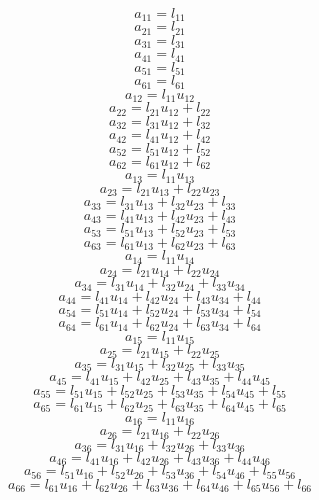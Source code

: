 \documentclass[10pt,a4paper,dvipdfmx]{article}
\begin{document}
\begin{multicols}{2}
$$ a_{{1}{1}} = l_{{1}{1}} $$
$$ a_{{2}{1}} = l_{{2}{1}} $$
$$ a_{{3}{1}} = l_{{3}{1}} $$
$$ a_{{4}{1}} = l_{{4}{1}} $$
$$ a_{{5}{1}} = l_{{5}{1}} $$
$$ a_{{6}{1}} = l_{{6}{1}} $$
$$ a_{{1}{2}} = l_{{1}{1}} u_{{1}{2}} $$
$$ a_{{2}{2}} = l_{{2}{1}} u_{{1}{2}} + l_{{2}{2}} $$
$$ a_{{3}{2}} = l_{{3}{1}} u_{{1}{2}} + l_{{3}{2}} $$
$$ a_{{4}{2}} = l_{{4}{1}} u_{{1}{2}} + l_{{4}{2}} $$
$$ a_{{5}{2}} = l_{{5}{1}} u_{{1}{2}} + l_{{5}{2}} $$
$$ a_{{6}{2}} = l_{{6}{1}} u_{{1}{2}} + l_{{6}{2}} $$
$$ a_{{1}{3}} = l_{{1}{1}} u_{{1}{3}} $$
$$ a_{{2}{3}} = l_{{2}{1}} u_{{1}{3}} + l_{{2}{2}} u_{{2}{3}} $$
$$ a_{{3}{3}} = l_{{3}{1}} u_{{1}{3}} + l_{{3}{2}} u_{{2}{3}} + l_{{3}{3}} $$
$$ a_{{4}{3}} = l_{{4}{1}} u_{{1}{3}} + l_{{4}{2}} u_{{2}{3}} + l_{{4}{3}} $$
$$ a_{{5}{3}} = l_{{5}{1}} u_{{1}{3}} + l_{{5}{2}} u_{{2}{3}} + l_{{5}{3}} $$
$$ a_{{6}{3}} = l_{{6}{1}} u_{{1}{3}} + l_{{6}{2}} u_{{2}{3}} + l_{{6}{3}} $$
$$ a_{{1}{4}} = l_{{1}{1}} u_{{1}{4}} $$
$$ a_{{2}{4}} = l_{{2}{1}} u_{{1}{4}} + l_{{2}{2}} u_{{2}{4}} $$
$$ a_{{3}{4}} = l_{{3}{1}} u_{{1}{4}} + l_{{3}{2}} u_{{2}{4}} + l_{{3}{3}} u_{{3}{4}} $$
$$ a_{{4}{4}} = l_{{4}{1}} u_{{1}{4}} + l_{{4}{2}} u_{{2}{4}} + l_{{4}{3}} u_{{3}{4}} + l_{{4}{4}} $$
$$ a_{{5}{4}} = l_{{5}{1}} u_{{1}{4}} + l_{{5}{2}} u_{{2}{4}} + l_{{5}{3}} u_{{3}{4}} + l_{{5}{4}} $$
$$ a_{{6}{4}} = l_{{6}{1}} u_{{1}{4}} + l_{{6}{2}} u_{{2}{4}} + l_{{6}{3}} u_{{3}{4}} + l_{{6}{4}} $$
$$ a_{{1}{5}} = l_{{1}{1}} u_{{1}{5}} $$
$$ a_{{2}{5}} = l_{{2}{1}} u_{{1}{5}} + l_{{2}{2}} u_{{2}{5}} $$
$$ a_{{3}{5}} = l_{{3}{1}} u_{{1}{5}} + l_{{3}{2}} u_{{2}{5}} + l_{{3}{3}} u_{{3}{5}} $$
$$ a_{{4}{5}} = l_{{4}{1}} u_{{1}{5}} + l_{{4}{2}} u_{{2}{5}} + l_{{4}{3}} u_{{3}{5}} + l_{{4}{4}} u_{{4}{5}} $$
$$ a_{{5}{5}} = l_{{5}{1}} u_{{1}{5}} + l_{{5}{2}} u_{{2}{5}} + l_{{5}{3}} u_{{3}{5}} + l_{{5}{4}} u_{{4}{5}} + l_{{5}{5}} $$
$$ a_{{6}{5}} = l_{{6}{1}} u_{{1}{5}} + l_{{6}{2}} u_{{2}{5}} + l_{{6}{3}} u_{{3}{5}} + l_{{6}{4}} u_{{4}{5}} + l_{{6}{5}} $$
$$ a_{{1}{6}} = l_{{1}{1}} u_{{1}{6}} $$
$$ a_{{2}{6}} = l_{{2}{1}} u_{{1}{6}} + l_{{2}{2}} u_{{2}{6}} $$
$$ a_{{3}{6}} = l_{{3}{1}} u_{{1}{6}} + l_{{3}{2}} u_{{2}{6}} + l_{{3}{3}} u_{{3}{6}} $$
$$ a_{{4}{6}} = l_{{4}{1}} u_{{1}{6}} + l_{{4}{2}} u_{{2}{6}} + l_{{4}{3}} u_{{3}{6}} + l_{{4}{4}} u_{{4}{6}} $$
$$ a_{{5}{6}} = l_{{5}{1}} u_{{1}{6}} + l_{{5}{2}} u_{{2}{6}} + l_{{5}{3}} u_{{3}{6}} + l_{{5}{4}} u_{{4}{6}} + l_{{5}{5}} u_{{5}{6}} $$
$$ a_{{6}{6}} = l_{{6}{1}} u_{{1}{6}} + l_{{6}{2}} u_{{2}{6}} + l_{{6}{3}} u_{{3}{6}} + l_{{6}{4}} u_{{4}{6}} + l_{{6}{5}} u_{{5}{6}} + l_{{6}{6}} $$

\end{multicols}
\end{document}
